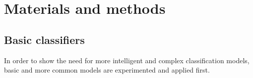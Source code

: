 \documentclass[a4paper,10pt,onecolumn,preprint,3p]{elsarticle}
\begin{document}
\section{Materials and methods}
\label{sec:materials}


\subsection{Basic classifiers}
\label{subsec:classifiers}

In order to show the need for more intelligent and complex classification models, basic and more common models are experimented and applied first. 
\end{document}
